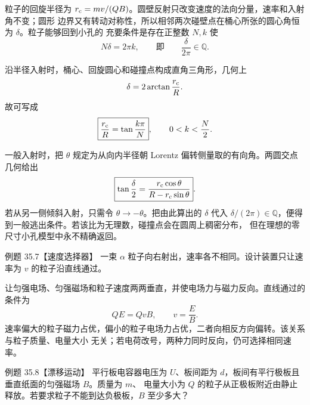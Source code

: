 \begin{xesolution}
粒子的回旋半径为 $r_{\rm c}=mv/(QB)$。圆壁反射只改变速度的法向分量，速率和入射角不变；圆形
边界又有转动对称性，所以相邻两次碰壁点在桶心所张的圆心角恒为 $\delta$。粒子能够回到小孔的
充要条件是存在正整数 $N,k$ 使
\begin{equation}
  N\delta=2\pi k,
  \qquad\text{即}\qquad \boxed{\frac{\delta}{2\pi}\in\mathbb Q}.
\end{equation}

沿半径入射时，桶心、回旋圆心和碰撞点构成直角三角形，几何上
\begin{equation}
  \delta=2\arctan\frac{r_{\rm c}}R.
\end{equation}
故可写成
\begin{equation}
  \boxed{\frac{r_{\rm c}}R=\tan\frac{k\pi}{N}},
  \qquad 0<k<\frac N2.
\end{equation}

一般入射时，把 $\theta$ 规定为从向内半径朝 Lorentz 偏转侧量取的有向角。两圆交点几何给出
\begin{equation}
  \boxed{\tan\frac\delta2=
  \frac{r_{\rm c}\cos\theta}{R-r_{\rm c}\sin\theta}}.
\end{equation}
若从另一侧倾斜入射，只需令 $\theta\to-\theta$。把由此算出的 $\delta$ 代入
$\delta/(2\pi)\in\mathbb Q$，便得到一般逃出条件。若该比为无理数，碰撞点会在圆周上稠密分布，
但在理想的零尺寸小孔模型中永不精确返回。

\magneticBilliardDiagram
\end{xesolution}

\Needspace{0.34\textheight}
\begin{origexamplebox}{例题 35.7【速度选择器】}
一束 $\alpha$ 粒子向右射出，速率各不相同。设计装置只让速率为 $v$ 的粒子沿直线通过。
\end{origexamplebox}

\begin{xesolution}
让匀强电场、匀强磁场和粒子速度两两垂直，并使电场力与磁力反向。直线通过的条件为
\begin{equation}
  Q E=QvB,
  \qquad \boxed{v=\frac EB}.
\end{equation}
速率偏大的粒子磁力占优，偏小的粒子电场力占优，二者向相反方向偏转。该关系与粒子质量、电量大小
无关；若电荷改号，两种力同时反向，仍可选择相同速率。

\velocitySelectorDiagram
\end{xesolution}

\Needspace{0.42\textheight}
\begin{origexamplebox}{例题 35.8【漂移运动】}
平行板电容器电压为 $U$、板间距为 $d$，板间有平行极板且垂直纸面的匀强磁场 $B$。质量为 $m$、
电量大小为 $Q$ 的粒子从正极板附近由静止释放。若要求粒子不能到达负极板，$B$ 至少多大？
\end{origexamplebox}

